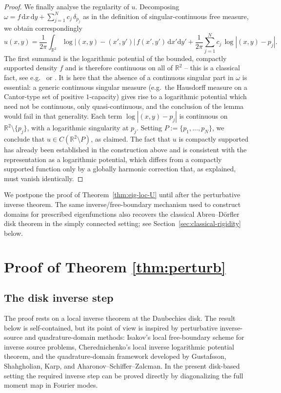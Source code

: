 \documentclass[a4paper,11pt,reqno]{amsart}
\numberwithin{equation}{section}
\theoremstyle{plain} %
\theoremstyle{definition} %
\theoremstyle{remark}
\newcommand{\R}{\mathbb{R}}
\begin{document}
\begin{proof}
We finally analyse the regularity of $u$. Decomposing
$\omega = f\,\mathrm{d}x\,\mathrm{d}y+\sum_{j=1}^N c_j\,\delta_{p_j}$ as in
the definition of singular-continuous free measure, we obtain
correspondingly
\[
u(x,y)=\frac{1}{2\pi}\int_{\R^2}\log|(x,y)-(x',y')|\,f(x',y')\,
\mathrm{d}x'\mathrm{d}y'
+\frac{1}{2\pi}\sum_{j=1}^N c_j\,\log|(x,y)-p_j|.
\]
The first summand is the logarithmic potential of the bounded, compactly
supported density \(f\) and is therefore continuous on all of \(\R^2\) -- this
is a classical fact, see e.g.\ \cite[Ch.~II, Theorem~1.3]{Garnett} or
\cite[\S 6.2]{Folland}. It is here that the absence of a continuous
singular part in $\omega$ is essential: a generic continuous singular
measure (e.g.\ the Hausdorff measure on a Cantor-type set of positive
$1$-capacity) gives rise to a logarithmic potential which need not be
continuous, only quasi-continuous, and the conclusion of the lemma would
fail in that generality. Each term $\log|(x,y)-p_j|$ is continuous on
$\R^2\setminus\{p_j\}$, with a logarithmic singularity at $p_j$. Setting
$P:=\{p_1,\ldots,p_N\}$, we conclude that $u\in C(\R^2\setminus P)$, as
claimed. The fact that $u$ is compactly supported has already been
established in the construction above and is consistent with the
representation as a logarithmic potential, which differs from a compactly
supported function only by a globally harmonic correction that, as
explained, must vanish identically.
\end{proof}

We postpone the proof of Theorem~\ref{thm:eig-loc-U} until after the
perturbative inverse theorem. The same inverse/free-boundary mechanism used
to construct domains for prescribed eigenfunctions also recovers the
classical Abreu--D\"orfler disk theorem in the simply connected setting; see
Section~\ref{sec:classical-rigidity} below.


\section{Proof of Theorem \ref{thm:perturb}}

\subsection{The disk inverse step}\label{subsec:disk-inverse-step}

The proof rests on a local inverse theorem at the Daubechies disk. The result
below is self-contained, but its point of view is inspired by perturbative
inverse-source and quadrature-domain methods: Isakov's local free-boundary
scheme for inverse source problems, Cherednichenko's local inverse logarithmic
potential theorem, and the quadrature-domain framework developed by
Gustafsson, Shahgholian, Karp, and Aharonov--Schiffer--Zalcman. In the present
disk-based setting the required inverse step can be proved directly by
diagonalizing the full moment map in Fourier modes.
\end{document}
